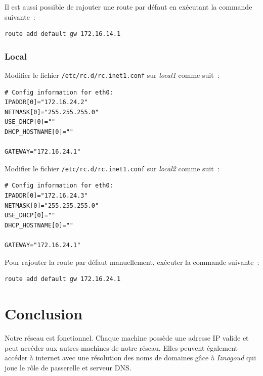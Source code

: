 \documentclass[11pt,a4paper,oneside]{article}
\begin{document}
Il est aussi possible de rajouter une route par défaut en exécutant la commande
suivante~:
\begin{verbatim}
route add default gw 172.16.14.1
\end{verbatim}

\subsubsection{Local}
Modifier le fichier \verb#/etc/rc.d/rc.inet1.conf# sur \emph{local1} comme
suit~:
\begin{verbatim}
# Config information for eth0:
IPADDR[0]="172.16.24.2"
NETMASK[0]="255.255.255.0"
USE_DHCP[0]=""
DHCP_HOSTNAME[0]=""

GATEWAY="172.16.24.1"
\end{verbatim}

Modifier le fichier \verb#/etc/rc.d/rc.inet1.conf# sur \emph{local2} comme
suit~:
\begin{verbatim}
# Config information for eth0:
IPADDR[0]="172.16.24.3"
NETMASK[0]="255.255.255.0"
USE_DHCP[0]=""
DHCP_HOSTNAME[0]=""

GATEWAY="172.16.24.1"
\end{verbatim}

Pour rajouter la route par défaut manuellement, exécuter la commande suivante~:
\begin{verbatim}
route add default gw 172.16.24.1
\end{verbatim}

\section{Conclusion}
Notre réseau est fonctionnel. Chaque machine possède une adresse IP valide et
peut accéder aux autres machines de notre réseau. Elles peuvent également
accéder à internet avec une résolution des noms de domaines g\^ace à
\emph{Iznogoud} qui joue le r\^ole de passerelle et serveur DNS.
\end{document}

